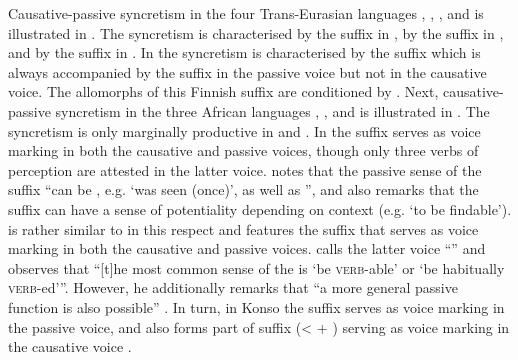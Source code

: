 Causative-passive syncretism in the four Trans-Eurasian languages , , , and  is illustrated in . The syncretism is characterised by the suffix  in , by the suffix  in , and by the suffix  in . In  the syncretism is characterised by the suffix  which is always accompanied by the suffix  in the passive voice but not in the causative voice. The allomorphs of this Finnish suffix are conditioned by . Next, causative-passive syncretism in the three African languages , , and  is illustrated in . The syncretism is only marginally productive in  and . In  the suffix  serves as voice marking in both the causative and passive voices, though only three verbs of perception are attested in the latter voice. \cite[237]{heath:2017b} notes that the passive sense of the suffix “can be , e.g. ‘was seen (once)’, as well as ”, and also remarks that the suffix can have a sense of potentiality depending on context (e.g. ‘to be findable’).  is rather similar to  in this respect and features the suffix  that serves as voice marking in both the causative and passive voices. \cite[382]{heath:2014} calls the latter voice “” and observes that “[t]he most common sense of the  is ‘be \textsc{verb}-able’ or ‘be habitually \textsc{verb}-ed’”. However, he additionally remarks that “a more general passive function is also possible” \citep[382]{heath:2014}. In turn, in Konso the suffix  serves as voice marking in the passive voice, and also forms part of suffix  (<  + ) serving as voice marking in the causative voice \citep[139]{orkaydo:2013}.


